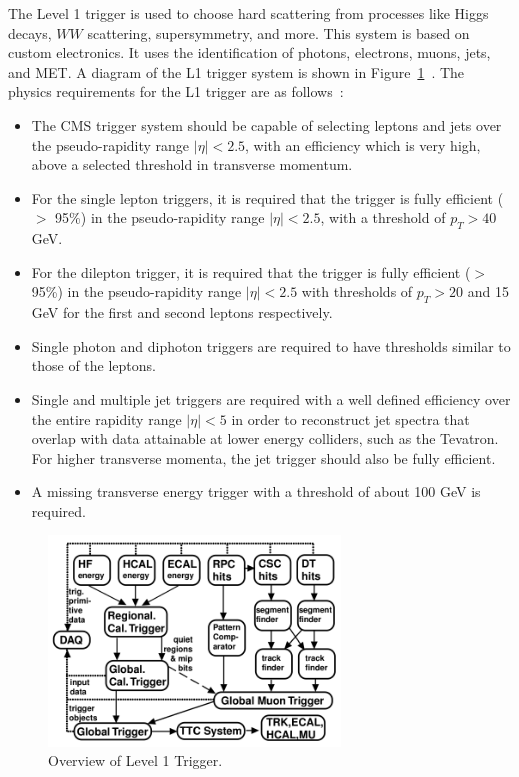 The Level 1 trigger is used to choose hard scattering from processes like Higgs decays, $WW$ scattering, supersymmetry, and more.  This system is based on custom electronics.  It uses the identification of photons, electrons, muons, jets, and MET. A diagram of the L1 trigger system is shown in Figure~\ref{fig:l1triggeroverview}~\cite{Bayatyan:706847}. The physics requirements for the L1 trigger are as follows~\cite{Bayatyan:706847}:
\begin{itemize}
  \item
    The CMS trigger system should be capable of selecting leptons and jets over the pseudo-rapidity range $|\eta| < 2.5$, with an efficiency which is very high, above a selected threshold in transverse momentum.
  \item
    For the single lepton triggers, it is required that the trigger is fully efficient ($>$ 95\%) in the pseudo-rapidity range $|\eta| < 2.5$, with a threshold of $p_T> 40$ GeV.
  \item
    For the dilepton trigger, it is required that the trigger is fully efficient ($>$ 95\%) in the pseudo-rapidity range $|\eta| < 2.5$ with thresholds of $p_T> 20$ and 15 GeV for the first and second leptons respectively.
  \item
    Single photon and diphoton triggers are required to have thresholds similar to those of the leptons.
  \item
    Single and multiple jet triggers are required with a well defined efficiency over the entire rapidity range $|\eta| < 5$ in order to reconstruct jet spectra that overlap with data attainable at lower energy colliders, such as the Tevatron. For higher transverse momenta, the jet trigger should also be fully efficient.
  \item
    A missing transverse energy trigger with a threshold of about 100 GeV is required.
\end{itemize}

\begin{figure}[htb]
\centering
\includegraphics[width=0.69\textwidth]{Experiment/l1trigger.pdf}
\caption{Overview of Level 1 Trigger.~\cite{Bayatyan:706847}}
\label{fig:l1triggeroverview}
\end{figure}

